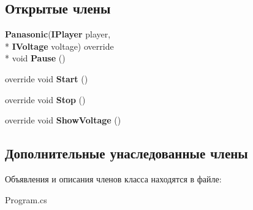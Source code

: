 \subsection*{Открытые члены}
\begin{DoxyCompactItemize}
\item 
{\bf Panasonic}({\bf I\-Player} player, \\*
{\bf I\-Voltage} voltage) override \\*
void {\bfseries Pause} ()\label{class_player___power_1_1_panasonic_ae3f5b9c9af4e25fe6364b94e2fde4d18}

\item 
override void {\bfseries Start} ()\label{class_player___power_1_1_panasonic_a78e006c41c0861f69dcbd66a99213023}

\item 
override void {\bfseries Stop} ()\label{class_player___power_1_1_panasonic_ac14217ffc5201092eccf0f62db67b9f0}

\item 
override void {\bfseries Show\-Voltage} ()\label{class_player___power_1_1_panasonic_ae854054c72fb47d085280d96d89feb63}

\end{DoxyCompactItemize}
\subsection*{Дополнительные унаследованные члены}


Объявления и описания членов класса находятся в файле\-:\begin{DoxyCompactItemize}
\item 
Program.\-cs\end{DoxyCompactItemize}
